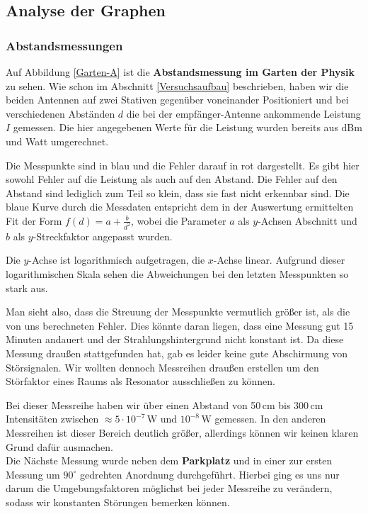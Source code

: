 \documentclass[titlepage,11pt,a4paper,ngerman]{article}
\newcommand{\tx}[1]{\textrm{#1}}
\begin{document}
\subsection{Analyse der Graphen}

\subsubsection{Abstandsmessungen}

Auf Abbildung \ref{Garten-A} ist die \textbf{Abstandsmessung im Garten der Physik} zu sehen. Wie schon im Abschnitt \ref{Versuchsaufbau} beschrieben, haben wir die beiden Antennen auf zwei Stativen gegenüber voneinander Positioniert und bei verschiedenen Abständen $ d $ die bei der empfänger-Antenne ankommende Leistung $ I $ gemessen. Die hier angegebenen Werte für die Leistung wurden bereits aus dBm und Watt umgerechnet.\par
Die Messpunkte sind in blau und die Fehler darauf in rot dargestellt. Es gibt hier sowohl Fehler auf die Leistung als auch auf den Abstand. Die Fehler auf den Abstand sind lediglich zum Teil so klein, dass sie fast nicht erkennbar sind. Die blaue Kurve durch die Messdaten entspricht dem in der Auswertung ermittelten Fit der Form $ f(d) = a + \frac{b}{d^2} $, wobei die Parameter $ a $ als $ y $-Achsen Abschnitt und $ b $ als $ y $-Streckfaktor angepasst wurden.\par
Die $ y $-Achse ist logarithmisch aufgetragen, die $ x $-Achse linear. Aufgrund dieser logarithmischen Skala sehen die Abweichungen bei den letzten Messpunkten so stark aus.\par
Man sieht also, dass die Streuung der Messpunkte vermutlich größer ist, als die von uns berechneten Fehler. Dies könnte daran liegen, dass eine Messung gut 15 Minuten andauert und der Strahlungshintergrund nicht konstant ist. Da diese Messung draußen stattgefunden hat, gab es leider keine gute Abschirmung von Störsignalen. Wir wollten dennoch Messreihen draußen erstellen um den Störfaktor eines Raums als Resonator ausschließen zu können.\par
Bei dieser Messreihe haben wir über einen Abstand von 50\,cm bis 300\,cm Intensitäten zwischen $ \approx 5 \cdot 10^{-7} \, \tx{W} $ und $ 10^{-8} \, \tx{W} $ gemessen. In den anderen Messreihen ist dieser Bereich deutlich größer, allerdings können wir keinen klaren Grund dafür ausmachen.\\[10pt]
\noindent
Die Nächste Messung wurde neben dem \textbf{Parkplatz} und in einer zur ersten Messung um $ 90^\circ $ gedrehten Anordnung durchgeführt. Hierbei ging es uns nur darum die Umgebungsfaktoren möglichst bei jeder Messreihe zu verändern, sodass wir konstanten Störungen bemerken können.\par
\end{document}
